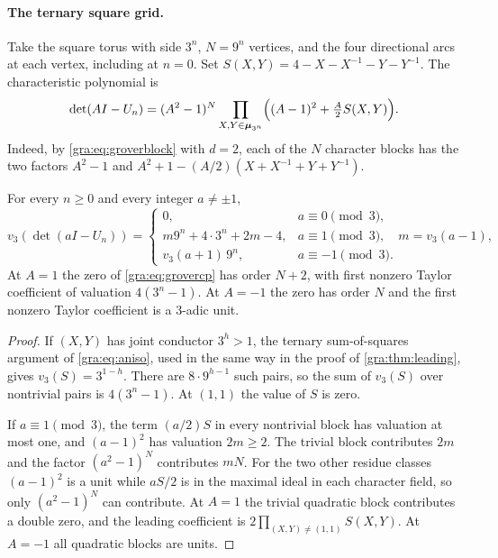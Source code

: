 \paragraph{The ternary square grid.}
Take the square torus with side $3^n$, $N=9^n$ vertices, and the four
directional arcs at each vertex, including at $n=0$. Set
$S(X,Y)=4-X-X^{-1}-Y-Y^{-1}$. The characteristic polynomial is
\begin{equation}\label{gra:eq:grovercp}
 \det(AI-U_n)=(A^2-1)^N\prod_{X,Y\in\boldsymbol{\mu}_{3^n}}
 \Bigl((A-1)^2+\tfrac A2S(X,Y)\Bigr).
\end{equation}
Indeed, by \eqref{gra:eq:groverblock} with $d=2$, each of the $N$ character blocks has the
two factors $A^2-1$ and $A^2+1-(A/2)(X+X^{-1}+Y+Y^{-1})$.

\begin{theorem}\label{gra:thm:grover}
For every $n\ge0$ and every integer $a\ne\pm1$,
\[
 v_3(\det(aI-U_n))=\begin{cases}
 0,&a\equiv0\pmod3,\\
 m9^n+4\cdot3^n+2m-4,&a\equiv1\pmod3,\quad m=v_3(a-1),\\
 v_3(a+1)\,9^n,&a\equiv-1\pmod3 .\end{cases}
\]
At $A=1$ the zero of \eqref{gra:eq:grovercp} has order $N+2$, with first
nonzero Taylor coefficient of valuation $4(3^n-1)$. At $A=-1$ the zero has
order $N$ and the first nonzero Taylor coefficient is a $3$-adic unit.
\end{theorem}

\begin{proof}
If $(X,Y)$ has joint conductor $3^h>1$, the ternary sum-of-squares
argument of \cref{gra:eq:aniso}, used in the same way in the proof of
\cref{gra:thm:leading}, gives $v_3(S)=3^{1-h}$.
There are $8\cdot9^{h-1}$ such pairs, so the sum of $v_3(S)$ over
nontrivial pairs is $4(3^n-1)$. At $(1,1)$ the value of $S$ is zero.

If $a\equiv1\pmod3$, the term $(a/2)S$ in every nontrivial block has
valuation at most one, and $(a-1)^2$ has valuation $2m\ge2$. The trivial
block contributes $2m$ and the factor $(a^2-1)^N$ contributes $mN$. For
the two other residue classes $(a-1)^2$ is a unit while $aS/2$ is in the
maximal ideal in each character field, so only $(a^2-1)^N$ can
contribute. At $A=1$ the trivial quadratic block contributes a double
zero, and the leading coefficient is $2\prod_{(X,Y)\ne(1,1)}S(X,Y)$. At
$A=-1$ all quadratic blocks are units.
\end{proof}

